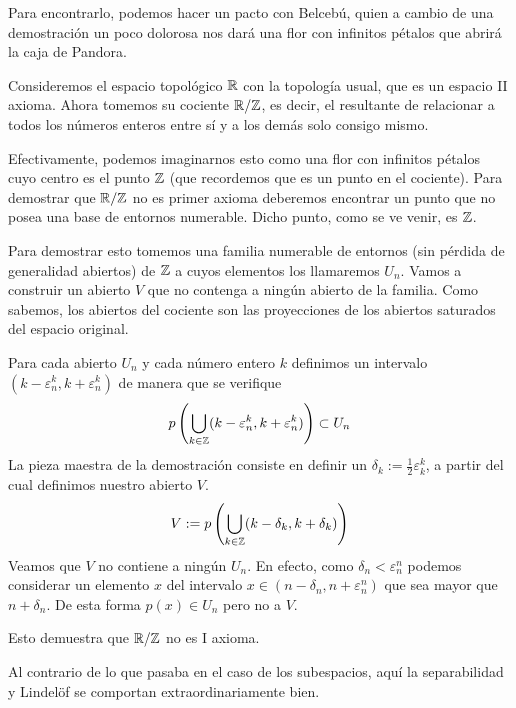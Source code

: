 Para encontrarlo, podemos hacer un pacto con Belcebú, quien a cambio de una demostración un poco dolorosa nos dará una flor con infinitos pétalos que abrirá la caja de Pandora.
\begin{exa}
	\label{num_exa_RZ}
	Consideremos el espacio topológico $\mathbb{R}$ con la topología usual, que es un espacio II axioma. Ahora tomemos su cociente $\mathbb{R}/\mathbb{Z}$, es decir, el resultante de relacionar a todos los números enteros entre sí y a los demás solo consigo mismo.
	
	Efectivamente, podemos imaginarnos esto como una flor con infinitos pétalos cuyo centro es el punto $\mathbb{Z}$ (que recordemos que es un punto en el cociente). Para demostrar que $\mathbb{R}/\mathbb{Z}$ no es primer axioma deberemos encontrar un punto que no posea una base de entornos numerable. Dicho punto, como se ve venir, es $\mathbb{Z}$.
	
	Para demostrar esto tomemos una familia numerable de entornos (sin pérdida de generalidad abiertos) de $\mathbb{Z}$ a cuyos elementos los llamaremos $U_n$. Vamos a construir un abierto $V$ que no contenga a ningún abierto de la familia. Como sabemos, los abiertos del cociente son las proyecciones de los abiertos saturados del espacio original.
	
	Para cada abierto $U_n$ y cada número entero $k$ definimos un intervalo $(k-\varepsilon_n^k,k+\varepsilon_n^k)$ de manera que se verifique
	\begin{equation*}
		p\left(\bigcup_{k\in\mathbb{Z}}(k-\varepsilon_n^k,k+\varepsilon_n^k)\right)\subset U_n
	\end{equation*}
	La pieza maestra de la demostración consiste en definir un $\delta_k:=\frac{1}{2}\varepsilon_k^k$, a partir del cual definimos nuestro abierto $V$.
	\begin{equation*}
		V:=p\left(\bigcup_{k\in\mathbb{Z}}(k-\delta_k,k+\delta_k)\right)
	\end{equation*}
	Veamos que $V$ no contiene a ningún $U_n$. En efecto, como $\delta_n<\varepsilon_n^n$ podemos considerar un elemento $x$ del intervalo $x\in(n-\delta_n,n+\varepsilon_n^n)$ que sea mayor que $n+\delta_n$. De esta forma $p(x)\in U_n$ pero no a $V$.
	
	Esto demuestra que $\mathbb{R}/\mathbb{Z}$ no es I axioma.
\end{exa}
Al contrario de lo que pasaba en el caso de los subespacios, aquí la separabilidad y Lindelöf se comportan extraordinariamente bien.

